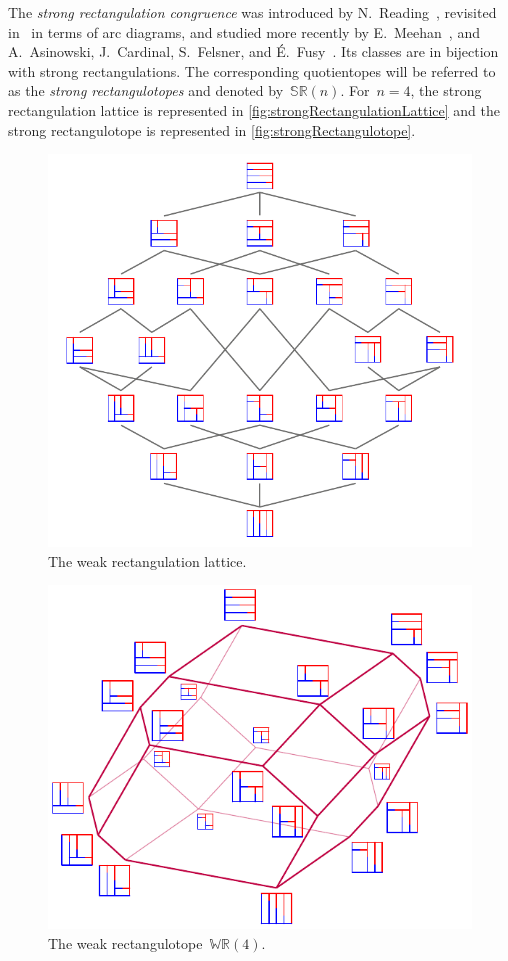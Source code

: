 \documentclass{amsart}
\theoremstyle{definition}
\newcommand{\darkblue}{\color{darkblue}} %
\newcommand{\defn}[1]{\textsl{\darkblue #1}} %
\newcommand{\polytope}[1]{\mathds{#1}} %
\newcommand{\WRP}{\polytope{WR}} %
\newcommand{\SRP}{\polytope{SR}} %
\begin{document}
The \defn{strong rectangulation congruence} was introduced by N.~Reading~\cite{MR2864445}, revisited in~\cite[Thm.~1.2 \& Exm.~4.11]{Reading-arcDiagrams} in terms of arc diagrams, and studied more recently by E.~Meehan~\cite{MR3697823}, and A.~Asinowski, J.~Cardinal, S.~Felsner, and É.~Fusy~\cite{ACFF24}.
Its classes are in bijection with strong rectangulations.
The corresponding quotientopes will be referred to as the \defn{strong rectangulotopes} and denoted by~$\SRP(n)$.
For~$n = 4$, the strong rectangulation lattice is represented in \cref{fig:strongRectangulationLattice} and the strong rectangulotope is represented in \cref{fig:strongRectangulotope}.

\begin{figure}
	\centerline{\includegraphics[scale=1.05]{weakRectangulationLattice}}
	\caption{The weak rectangulation lattice.}
	\label{fig:weakRectangulationLattice}
\end{figure}
\begin{figure}
	\centerline{\includegraphics[scale=1.05]{weakRectangulotopeLabeled}}
	\caption{The weak rectangulotope~$\WRP(4)$.}
        \label{fig:weakRectangulotope}
\end{figure}
\end{document}
